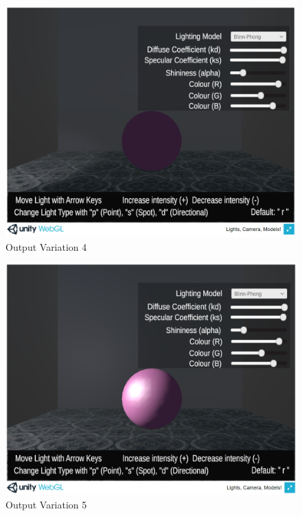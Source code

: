 \documentclass[12pt, titlepage]{article}
\begin{document}
\begin{enumerate}
	\begin{figure}[h]
		\centering
		\includegraphics[scale=0.25]{./images/fromVnVPlan/sphere-lit-spotlight-moveBounds}
		\caption{Output Variation 4}
		\label{fig:spotlight-bounds-left}
	\end{figure}	
	
	\begin{figure}[h]
		\centering
		\includegraphics[scale=0.25]{./images/fromVnVPlan/sphere-lit-point-moveBounds}
		\caption{Output Variation 5}
		\label{fig:point-bounds-left}
	\end{figure}	
	

\end{enumerate}
\end{document}
